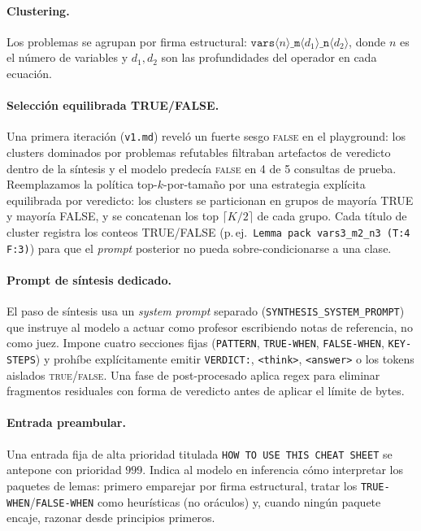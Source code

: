 \documentclass{article}
\begin{document}
\paragraph{Clustering.} Los problemas se agrupan por firma estructural: $\texttt{vars}\langle n \rangle\texttt{\_m}\langle d_1 \rangle\texttt{\_n}\langle d_2 \rangle$, donde $n$ es el n\'umero de variables y $d_1, d_2$ son las profundidades del operador en cada ecuaci\'on.

\paragraph{Selecci\'on equilibrada TRUE/FALSE.} Una primera iteraci\'on (\texttt{v1.md}) revel\'o un fuerte sesgo \textsc{false} en el playground: los clusters dominados por problemas refutables filtraban artefactos de veredicto dentro de la s\'intesis y el modelo predec\'ia \textsc{false} en 4 de 5 consultas de prueba. Reemplazamos la pol\'itica top-$k$-por-tama\~no por una estrategia expl\'icita equilibrada por veredicto: los clusters se particionan en grupos de mayor\'ia TRUE y mayor\'ia FALSE, y se concatenan los top $\lceil K/2 \rceil$ de cada grupo. Cada t\'itulo de cluster registra los conteos TRUE/FALSE (p.\,ej.\ \texttt{Lemma pack vars3\_m2\_n3 (T:4 F:3)}) para que el \textit{prompt} posterior no pueda sobre-condicionarse a una clase.

\paragraph{Prompt de s\'intesis dedicado.} El paso de s\'intesis usa un \textit{system prompt} separado (\texttt{SYNTHESIS\_SYSTEM\_PROMPT}) que instruye al modelo a actuar como profesor escribiendo notas de referencia, no como juez. Impone cuatro secciones fijas (\texttt{PATTERN}, \texttt{TRUE-WHEN}, \texttt{FALSE-WHEN}, \texttt{KEY-STEPS}) y proh\'ibe expl\'icitamente emitir \texttt{VERDICT:}, \texttt{<think>}, \texttt{<answer>} o los tokens aislados \textsc{true}/\textsc{false}. Una fase de post-procesado aplica regex para eliminar fragmentos residuales con forma de veredicto antes de aplicar el l\'imite de bytes.

\paragraph{Entrada preambular.} Una entrada fija de alta prioridad titulada \texttt{HOW TO USE THIS CHEAT SHEET} se antepone con prioridad $999$. Indica al modelo en inferencia c\'omo interpretar los paquetes de lemas: primero emparejar por firma estructural, tratar los \texttt{TRUE-WHEN}/\texttt{FALSE-WHEN} como heur\'isticas (no or\'aculos) y, cuando ning\'un paquete encaje, razonar desde principios primeros.
\end{document}
